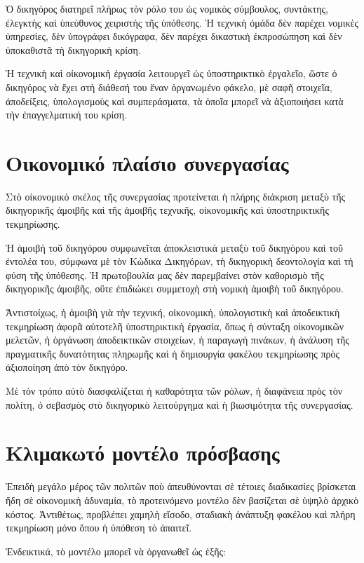 \documentclass[12pt,a4paper]{article}
\begin{document}
Ὁ δικηγόρος διατηρεῖ πλήρως τὸν ρόλο του ὡς νομικὸς σύμβουλος, συντάκτης, ἐλεγκτὴς καὶ ὑπεύθυνος χειριστὴς τῆς ὑπόθεσης. Ἡ τεχνικὴ ὁμάδα δὲν παρέχει νομικὲς ὑπηρεσίες, δὲν ὑπογράφει δικόγραφα, δὲν παρέχει δικαστικὴ ἐκπροσώπηση καὶ δὲν ὑποκαθιστᾶ τὴ δικηγορικὴ κρίση. 

Ἡ τεχνικὴ καὶ οἰκονομικὴ ἐργασία λειτουργεῖ ὡς ὑποστηρικτικὸ ἐργαλεῖο, ὥστε ὁ δικηγόρος νὰ ἔχει στὴ διάθεσή του ἕναν ὀργανωμένο φάκελο, μὲ σαφῆ στοιχεῖα, ἀποδείξεις, ὑπολογισμοὺς καὶ συμπεράσματα, τὰ ὁποῖα μπορεῖ νὰ ἀξιοποιήσει κατὰ τὴν ἐπαγγελματική του κρίση. 

\section{Οικονομικό πλαίσιο συνεργασίας} 

Στὸ οἰκονομικὸ σκέλος τῆς συνεργασίας προτείνεται ἡ πλήρης διάκριση μεταξὺ τῆς δικηγορικῆς ἀμοιβῆς καὶ τῆς ἀμοιβῆς τεχνικῆς, οἰκονομικῆς καὶ ὑποστηρικτικῆς τεκμηρίωσης. 

Ἡ ἀμοιβὴ τοῦ δικηγόρου συμφωνεῖται ἀποκλειστικὰ μεταξὺ τοῦ δικηγόρου καὶ τοῦ ἐντολέα του, σύμφωνα μὲ τὸν Κώδικα Δικηγόρων, τὴ δικηγορικὴ δεοντολογία καὶ τὴ φύση τῆς ὑπόθεσης. Ἡ πρωτοβουλία μας δὲν παρεμβαίνει στὸν καθορισμὸ τῆς δικηγορικῆς ἀμοιβῆς, οὔτε ἐπιδιώκει συμμετοχὴ στὴ νομικὴ ἀμοιβὴ τοῦ δικηγόρου. 

Ἀντιστοίχως, ἡ ἀμοιβὴ γιὰ τὴν τεχνική, οἰκονομική, ὑπολογιστικὴ καὶ ἀποδεικτικὴ τεκμηρίωση ἀφορᾶ αὐτοτελῆ ὑποστηρικτικὴ ἐργασία, ὅπως ἡ σύνταξη οἰκονομικῶν μελετῶν, ἡ ὀργάνωση ἀποδεικτικῶν στοιχείων, ἡ παραγωγὴ πινάκων, ἡ ἀνάλυση τῆς πραγματικῆς δυνατότητας πληρωμῆς καὶ ἡ δημιουργία φακέλου τεκμηρίωσης πρὸς ἀξιοποίηση ἀπὸ τὸν δικηγόρο. 

Μὲ τὸν τρόπο αὐτὸ διασφαλίζεται ἡ καθαρότητα τῶν ρόλων, ἡ διαφάνεια πρὸς τὸν πολίτη, ὁ σεβασμὸς στὸ δικηγορικὸ λειτούργημα καὶ ἡ βιωσιμότητα τῆς συνεργασίας. 

\section{Κλιμακωτό μοντέλο πρόσβασης} 

Ἐπειδὴ μεγάλο μέρος τῶν πολιτῶν ποὺ ἀπευθύνονται σὲ τέτοιες διαδικασίες βρίσκεται ἤδη σὲ οἰκονομικὴ ἀδυναμία, τὸ προτεινόμενο μοντέλο δὲν βασίζεται σὲ ὑψηλὸ ἀρχικὸ κόστος. Ἀντιθέτως, προβλέπει χαμηλὴ εἴσοδο, σταδιακὴ ἀνάπτυξη φακέλου καὶ πλήρη τεκμηρίωση μόνο ὅπου ἡ ὑπόθεση τὸ ἀπαιτεῖ. 

Ἐνδεικτικά, τὸ μοντέλο μπορεῖ νὰ ὀργανωθεῖ ὡς ἑξῆς: 
	
\end{document}
